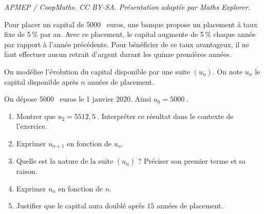 \documentclass[10pt]{article}
\providecommand{\np}[2][]{{#2~#1}}
\begin{document}
\noindent\textit{APMEP / CoopMaths. CC BY-SA. Présentation adaptée par Maths Explorer.}\par\medskip
\medskip

Pour placer un capital de \np{5000} euros, une banque propose un placement à taux fixe de 5\,\%
par an. Avec ce placement, le capital augmente de 5\,\% chaque année par rapport à l'année
précédente. Pour bénéficier de ce taux avantageux, il ne faut effectuer aucun retrait
d'argent durant les quinze premières années.

On modélise l'évolution du capital disponible par une suite $\left(u_n\right)$. On note $u_n$ le capital
disponible après $n$ années de placement.

On dépose \np{5000} euros le 1 janvier 2020. Ainsi $u_0 = \np{5000} $.

\medskip

\begin{enumerate}
\item Montrer que $u_2 = \np{5512,5}$. Interpréter ce résultat dans le contexte de l'exercice.
\item Exprimer $u_{n+1}$ en fonction de $u_n$.
\item Quelle est la nature de la suite $\left(u_n\right)$ ? Préciser son premier terme et sa raison.
\item Exprimer $u_n$ en fonction de $n$.
\item Justifier que le capital aura doublé après $15$ années de placement.
\end{enumerate}

\vspace{0,5cm}
\end{document}
